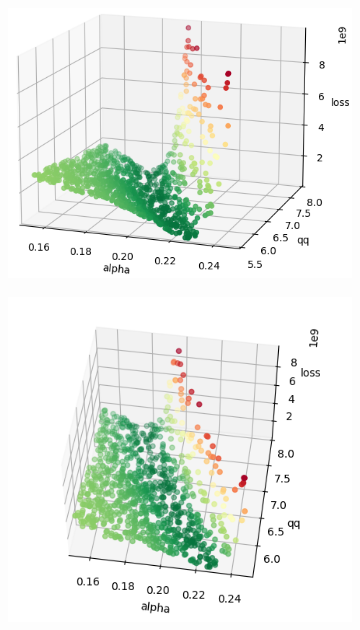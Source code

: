 \begin{figure}[h]
	\centering
	\begin{subfigure}[b]{0.4\textwidth}
		\centering
		\includegraphics[width=\textwidth]{./figures/sensitivity/sensitivity_zoom1_0_2.png}	
	\end{subfigure}
	\begin{subfigure}[b]{0.4\textwidth}
		\centering
		\includegraphics[width=\textwidth]{./figures/sensitivity/sensitivity_zoom1_1_2.png}	

\end{subfigure}
\end{figure}
